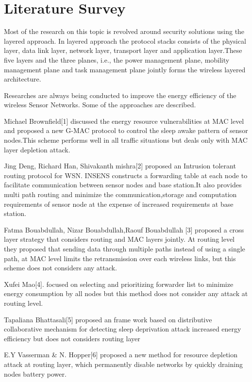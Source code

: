 \documentclass[twocolumn,10pt]{article}
\begin{document}
\section{Literature Survey}

Most of the research on this topic is revolved around security  solutions using the layered approach. In layered approach the protocol  stacks consists of the physical layer, data link layer, network  layer, transport layer and application layer.These five layers  and the three planes, i.e., the power management plane,  mobility management plane and task management plane  jointly forms the wireless layered architecture.

Researches are always being conducted to improve the energy efficiency of the 
wireless Sensor Networks. Some of the approaches are described. 

Michael Brownfield[1] discussed the energy resource vulnerabilities at MAC level and proposed a new G-MAC protocol to control the sleep awake pattern of sensor nodes.This scheme performs well in all traffic situations but deals only with MAC layer depletion attack.

Jing Deng, Richard Han, Shivakanth mishra[2] proposed an Intrusion tolerant routing protocol for WSN. INSENS constructs a forwarding table at each node to facilitate communication between sensor nodes and base station.It also provides multi path routing and minimize the communication,storage and computation requirements of sensor node at the expense of increased requirements at base station.


Fatma Bouabdullah, Nizar Bouabdullah,Raouf Bouabdullah [3] proposed a cross layer strategy that considers routing and MAC layers jointly. At routing level they proposed that sending data through multiple paths instead of using a single path, at MAC level limits the retransmission over each wireless links, but this scheme does not considers any attack. 

Xufei Mao[4]. focused on selecting and prioritizing forwarder list to minimize energy consumption by all nodes but this method does not consider any attack at routing level.

Tapaliana Bhattasali[5] proposed an  frame work based on distributive collaborative mechanism for detecting sleep deprivation attack  increased energy efficiency but does not considers routing layer  

E.Y Vasserman & N. Hopper[6] proposed a new method for resource depletion attack at routing layer, which permanently disable networks by quickly draining nodes battery power.
\end{document}
